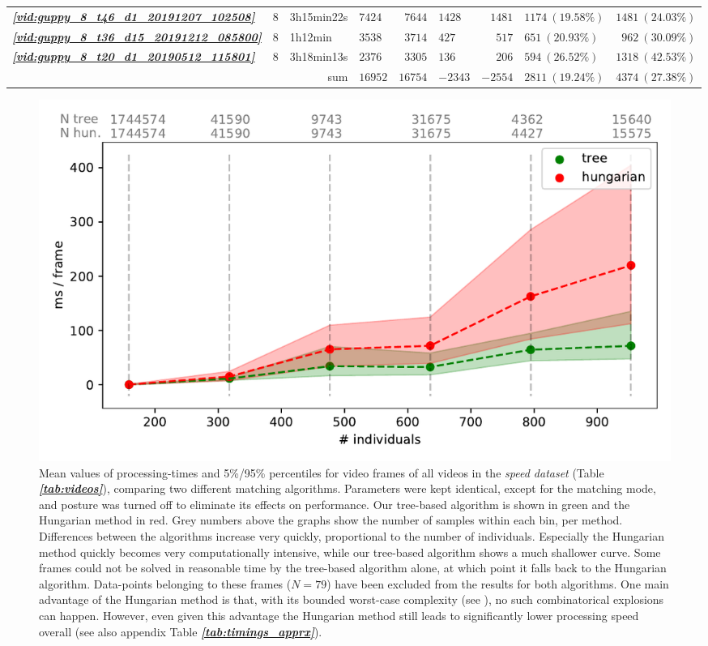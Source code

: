 \documentclass[9pt,lineno]{elife}
\newcommand{\vidref}[1]{\textit{\textbf{\ref{#1}}}}
\newcommand{\tableref}[1]{\textit{\textbf{\ref{tab:#1}}}\xspace}
\begin{document}
\begin{table}
\begin{tabular}{l l l || l r | l r | l r }
\vidref{vid:guppy_8_t46_d1_20191207_102508} & $ 8 $ &  3h15min22s  & $ 7424 $ & $ 7644 $ & $ 1428 $ & $ 1481 $ & $ 1174 \ ( 19.58 \%)$ & $ 1481 \ ( 24.03 \%)$\\
\vidref{vid:guppy_8_t36_d15_20191212_085800} & $ 8 $ &  1h12min  & $ 3538 $ & $ 3714 $ & $ 427 $ & $ 517 $ & $ 651 \ ( 20.93 \%)$ & $ 962 \ ( 30.09 \%)$\\
\vidref{vid:guppy_8_t20_d1_20190512_115801} & $ 8 $ &  3h18min13s  & $ 2376 $ & $ 3305 $ & $ 136 $ & $ 206 $ & $ 594 \ ( 26.52 \%)$ & $ 1318 \ ( 42.53 \%)$\\
\hline
\multicolumn{3}{r||}{sum} & $ 16952 $ & $ 16754 $ & $ - 2343 $ & $- 2554 $ &$ 2811 \ ( 19.24 \%)$ & $ 4374 \ ( 27.38 \%)$ \\
\bottomrule
\end{tabular}
\end{table}

\begin{figure}
\includegraphics[width=0.9\linewidth]{figures/approx_accurate.pdf}
\caption{Mean values of processing-times and 5\%/95\% percentiles for video frames of all videos in the \textit{speed dataset} (Table \tableref{videos}), comparing two different matching algorithms. Parameters were kept identical, except for the matching mode, and posture was turned off to eliminate its effects on performance. Our tree-based algorithm is shown in green and the Hungarian method in red. Grey numbers above the graphs show the number of samples within each bin, per method. Differences between the algorithms increase very quickly, proportional to the number of individuals. Especially the Hungarian method quickly becomes very computationally intensive, while our tree-based algorithm shows a much shallower curve. Some frames could not be solved in reasonable time by the tree-based algorithm alone, at which point it falls back to the Hungarian algorithm. Data-points belonging to these frames ($N=79$) have been excluded from the results for both algorithms. One main advantage of the Hungarian method is that, with its bounded worst-case complexity (see ), no such combinatorical explosions can happen. However, even given this advantage the Hungarian method still leads to significantly lower processing speed overall (see also appendix Table \tableref{timings_apprx}).}
\label{fig:approx_accurate}
\end{figure}
\end{document}
